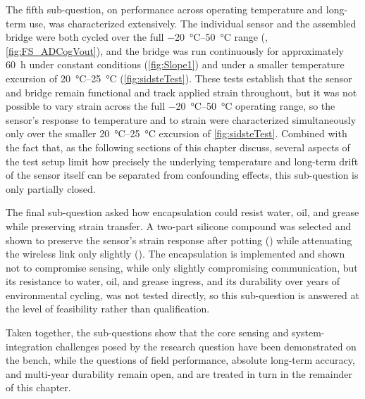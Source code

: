The fifth sub-question, on performance across operating temperature and long-term use, was characterized extensively. The individual sensor and the assembled bridge were both cycled over the full \SIrange{-20}{50}{\celsius} range (, \cref{fig:FS_ADCogVout}), and the bridge was run continuously for approximately \SI{60}{\hour} under constant conditions (\cref{fig:Slope1}) and under a smaller temperature excursion of \SIrange{20}{25}{\celsius} (\cref{fig:sidsteTest}). These tests establish that the sensor and bridge remain functional and track applied strain throughout, but it was not possible to vary strain across the full \SIrange{-20}{50}{\celsius} operating range, so the sensor's response to temperature and to strain were characterized simultaneously only over the smaller \SIrange{20}{25}{\celsius} excursion of \cref{fig:sidsteTest}. Combined with the fact that, as the following sections of this chapter discuss, several aspects of the test setup limit how precisely the underlying temperature and long-term drift of the sensor itself can be separated from confounding effects, this sub-question is only partially closed.

The final sub-question asked how encapsulation could resist water, oil, and grease while preserving strain transfer. A two-part silicone compound was selected and shown to preserve the sensor's strain response after potting () while attenuating the wireless link only slightly (). The encapsulation is implemented and shown not to compromise sensing, while only slightly compromising communication, but its resistance to water, oil, and grease ingress, and its durability over years of environmental cycling, was not tested directly, so this sub-question is answered at the level of feasibility rather than qualification.

Taken together, the sub-questions show that the core sensing and system-integration challenges posed by the research question have been demonstrated on the bench, while the questions of field performance, absolute long-term accuracy, and multi-year durability remain open, and are treated in turn in the remainder of this chapter.

